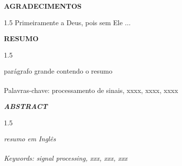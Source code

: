 \documentclass[a4paper,12pt,openright,oneside]{book}
\newenvironment{myenv}[1]
  {\begin{spacing}{#1}}
  {\end{spacing}}
\begin{document}
\newpage \thispagestyle{empty}
\vspace{1.5cm}
\fontsize{12}{\baselineskip} \selectfont
\begin{center}
{\huge{\textbf{AGRADECIMENTOS}}}
\end{center}
\begin{myenv}{1.5}
\vspace{1.5pt}
\vspace{1.5pt}
Primeiramente a Deus, pois sem Ele ... 
\end{myenv}
\setlength{\parindent}{0pt}
\newpage \thispagestyle{empty}
\vspace{1.5cm}
\fontsize{12}{\baselineskip} \selectfont
\begin{center}
{\huge{\textbf{RESUMO}}}
\end{center}
\begin{myenv}{1.5}
\fontsize{12}{\baselineskip} \selectfont \onehalfspacing
\par \null
\par {} par\'{a}grafo grande contendo o resumo
\\
\\
Palavras-chave: processamento de sinais, xxxx, xxxx, xxxx
\end{myenv}
\setlength{\parindent}{0pt}
\newpage \thispagestyle{empty}
\vspace{1.5cm}
\fontsize{12}{\baselineskip} \selectfont
\begin{center}
{\huge{\textit{ \textbf{ABSTRACT}}}}
\end{center}
\begin{myenv}{1.5}
\fontsize{12}{\baselineskip} \selectfont \onehalfspacing
\par \null
\par \null
\textit{resumo em Ingl\^{e}s}\\
\\
\textit{Keywords: signal processing, xxx, xxx, xxx}
\end{myenv}
\cleardoublepage
{}
\listoffigures
\cleardoublepage
{}
\listoftables
\frontmatter
\def\contentsname{Sum{\'a}rio} 
\tableofcontents
\cleardoublepage
\mainmatter
\setlength{\parindent}{1.25cm}
\end{document}
